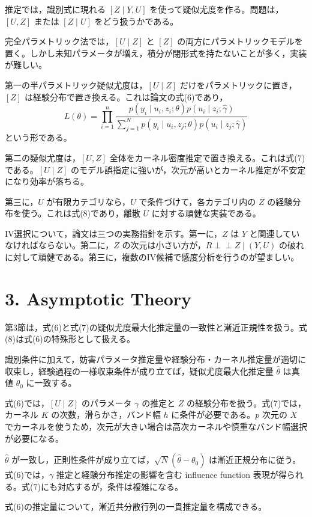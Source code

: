 \documentclass[dvipdfmx,autodetect-engine]{jsarticle}
\newcommand{\indep}{\mathrel{\perp\!\!\!\perp}}
\begin{document}
推定では，識別式に現れる $[Z\mid Y,U]$ を使って疑似尤度を作る。問題は，$[U,Z]$ または $[Z\mid U]$ をどう扱うかである。

完全パラメトリック法では，$[U\mid Z]$ と $[Z]$ の両方にパラメトリックモデルを置く。しかし未知パラメータが増え，積分が閉形式を持たないことが多く，実装が難しい。

第一の半パラメトリック疑似尤度は，$[U\mid Z]$ だけをパラメトリックに置き，$[Z]$ は経験分布で置き換える。これは論文の式(6)であり，
\[
L(\theta)=\prod_{i=1}^n
\frac{p(y_i\mid u_i,z_i;\theta)p(u_i\mid z_i;\widehat\gamma)}
{\sum_{j=1}^N p(y_i\mid u_i,z_j;\theta)p(u_i\mid z_j;\widehat\gamma)}
\]
という形である。

第二の疑似尤度は，$[U,Z]$ 全体をカーネル密度推定で置き換える。これは式(7)である。$[U\mid Z]$ のモデル誤指定に強いが，次元が高いとカーネル推定が不安定になり効率が落ちる。

第三に，$U$ が有限カテゴリなら，$U$ で条件づけて，各カテゴリ内の $Z$ の経験分布を使う。これは式(8)であり，離散 $U$ に対する頑健な実装である。

IV選択について，論文は三つの実務指針を示す。第一に，$Z$ は $Y$ と関連していなければならない。第二に，$Z$ の次元は小さい方が，$R\indep Z\mid (Y,U)$ の破れに対して頑健である。第三に，複数のIV候補で感度分析を行うのが望ましい。

\section{3. Asymptotic Theory}

第3節は，式(6)と式(7)の疑似尤度最大化推定量の一致性と漸近正規性を扱う。式(8)は式(6)の特殊形として扱える。

\begin{description}[leftmargin=3.2em]
\item[Theorem 2] 識別条件に加えて，妨害パラメータ推定量や経験分布・カーネル推定量が適切に収束し，経験過程の一様収束条件が成り立てば，疑似尤度最大化推定量 $\widehat\theta$ は真値 $\theta_0$ に一致する。
\end{description}

式(6)では，$[U\mid Z]$ のパラメータ $\gamma$ の推定と $Z$ の経験分布を扱う。式(7)では，カーネル $K$ の次数，滑らかさ，バンド幅 $h$ に条件が必要である。$p$ 次元の $X$ でカーネルを使うため，次元が大きい場合は高次カーネルや慎重なバンド幅選択が必要になる。

\begin{description}[leftmargin=3.2em]
\item[Theorem 3] $\widehat\theta$ が一致し，正則性条件が成り立てば，$\sqrt N(\widehat\theta-\theta_0)$ は漸近正規分布に従う。式(6)では，$\gamma$ 推定と経験分布推定の影響を含む influence function 表現が得られる。式(7)にも対応するが，条件は複雑になる。
\item[Theorem 4] 式(6)の推定量について，漸近共分散行列の一貫推定量を構成できる。
\end{description}
\end{document}
